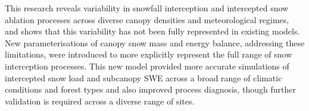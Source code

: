 {This research reveals variability in snowfall interception and intercepted snow ablation processes across diverse canopy densities and meteorological regimes, and shows that this variability has not been fully represented in existing models. New parameterisations of canopy snow mass and energy balance, addressing these limitations, were introduced to more explicitly represent the full range of snow interception processes. This new model provided more accurate simulations of intercepted snow load and subcanopy SWE across a broad range of climatic conditions and forest types and also improved process diagnosis, though further validation is required across a diverse range of sites.
}
